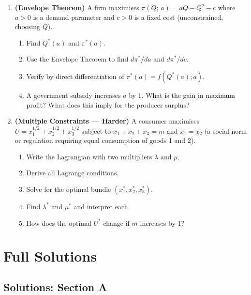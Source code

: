 \documentclass[12pt, a4paper]{article}
\theoremstyle{definition}
\begin{document}
\begin{enumerate}[label=\textbf{B\arabic*.}, leftmargin=2.5em]
\item \textbf{(Envelope Theorem)}
A firm maximises $\pi(Q;\,a) = aQ - Q^2 - c$ where $a>0$ is a demand
parameter and $c>0$ is a fixed cost (unconstrained, choosing $Q$).
\begin{enumerate}[label=(\alph*)]
  \item Find $Q^*(a)$ and $\pi^*(a)$.
  \item Use the Envelope Theorem to find $d\pi^*/da$ and $d\pi^*/dc$.
  \item Verify by direct differentiation of $\pi^*(a) = f(Q^*(a);a)$.
  \item A government subsidy increases $a$ by 1. What is the gain in
        maximum profit? What does this imply for the producer surplus?
\end{enumerate}

\item \textbf{(Multiple Constraints --- Harder)}
A consumer maximises $U = x_1^{1/2} + x_2^{1/2} + x_3^{1/2}$ subject
to $x_1 + x_2 + x_3 = m$ and $x_1 = x_2$ (a social norm or regulation
requiring equal consumption of goods 1 and 2).
\begin{enumerate}[label=(\alph*)]
  \item Write the Lagrangian with two multipliers $\lambda$ and $\mu$.
  \item Derive all Lagrange conditions.
  \item Solve for the optimal bundle $(x_1^*, x_2^*, x_3^*)$.
  \item Find $\lambda^*$ and $\mu^*$ and interpret each.
  \item How does the optimal $U^*$ change if $m$ increases by 1?
\end{enumerate}

\end{enumerate}

\newpage
\section{Full Solutions}

\subsection{Solutions: Section A}
\end{document}
